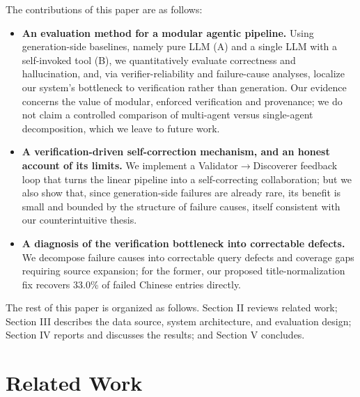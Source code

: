 \documentclass[conference]{IEEEtran}
\begin{document}
The contributions of this paper are as follows:

\begin{itemize}
\item \textbf{An evaluation method for a modular agentic pipeline.}
Using generation-side baselines, namely pure LLM (A) and a single LLM with a
self-invoked tool (B), we quantitatively evaluate correctness and
hallucination, and, via verifier-reliability and failure-cause analyses,
localize our system's bottleneck to verification rather than generation. Our
evidence concerns the value of modular, enforced verification and provenance;
we do not claim a controlled comparison of multi-agent versus single-agent
decomposition, which we leave to future work.

\item \textbf{A verification-driven self-correction mechanism, and an honest
account of its limits.} We implement a Validator$\rightarrow$Discoverer
feedback loop that turns the linear pipeline into a self-correcting
collaboration; but we also show that, since generation-side failures are
already rare, its benefit is small and bounded by the structure of failure
causes, itself consistent with our counterintuitive thesis.

\item \textbf{A diagnosis of the verification bottleneck into correctable
defects.} We decompose failure causes into correctable query defects and
coverage gaps requiring source expansion; for the former, our proposed
title-normalization fix recovers 33.0\% of failed Chinese entries directly.
\end{itemize}

The rest of this paper is organized as follows. Section II reviews related work;
Section III describes the data source, system architecture, and evaluation
design; Section IV reports and discusses the results; and Section V concludes.

\section{Related Work}
\end{document}
